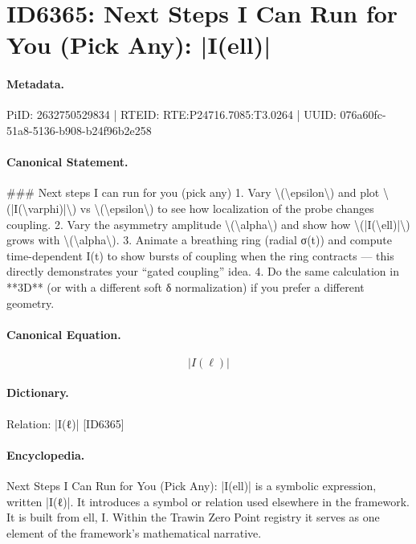 \section*{ID6365: Next Steps I Can Run for You (Pick Any): |I(ell)|}
\paragraph{Metadata.}
PiID: 2632750529834 | RTEID: RTE:P24716.7085:T3.0264 | UUID: 076a60fc-51a8-5136-b908-b24f96b2e258

\paragraph{Canonical Statement.}
\#\#\# Next steps I can run for you (pick any) 1. Vary \textbackslash{}(\textbackslash{}epsilon\textbackslash{}) and plot \textbackslash{}(|I(\textbackslash{}varphi)|\textbackslash{}) vs \textbackslash{}(\textbackslash{}epsilon\textbackslash{}) to see how localization of the probe changes coupling. 2. Vary the asymmetry amplitude \textbackslash{}(\textbackslash{}alpha\textbackslash{}) and show how \textbackslash{}(|I(\textbackslash{}ell)|\textbackslash{}) grows with \textbackslash{}(\textbackslash{}alpha\textbackslash{}). 3. Animate a breathing ring (radial σ(t)) and compute time-dependent I(t) to show bursts of coupling when the ring contracts — this directly demonstrates your “gated coupling” idea. 4. Do the same calculation in **3D** (or with a different soft δ normalization) if you prefer a different geometry.

\paragraph{Canonical Equation.}
\[
|I(\ell)|
\]

\paragraph{Dictionary.}
Relation: |I(ℓ)| [ID6365]

\paragraph{Encyclopedia.}
Next Steps I Can Run for You (Pick Any): |I(ell)| is a symbolic expression, written |I(ℓ)|. It introduces a symbol or relation used elsewhere in the framework. It is built from ell, I. Within the Trawin Zero Point registry it serves as one element of the framework's mathematical narrative.
